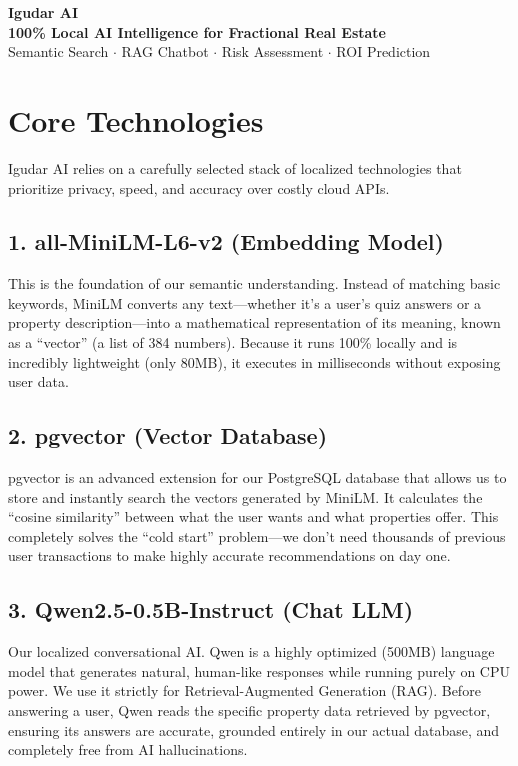 \documentclass[12pt,a4paper]{article}
\begin{document}
\begin{center}
    {\Huge \textbf{\textcolor{primary}{Igudar AI}}}\\[0.5em]
    {\Large \textbf{100\% Local AI Intelligence for Fractional Real Estate}}\\[1em]
    {\small Semantic Search $\cdot$ RAG Chatbot $\cdot$ Risk Assessment $\cdot$ ROI Prediction}
    \vspace{2em}
\end{center}

\section*{Core Technologies}
Igudar AI relies on a carefully selected stack of localized technologies that prioritize privacy, speed, and accuracy over costly cloud APIs.

\subsection*{1. all-MiniLM-L6-v2 (Embedding Model)}
This is the foundation of our semantic understanding. Instead of matching basic keywords, MiniLM converts any text---whether it's a user's quiz answers or a property description---into a mathematical representation of its meaning, known as a ``vector'' (a list of 384 numbers). Because it runs 100\% locally and is incredibly lightweight (only 80MB), it executes in milliseconds without exposing user data.

\subsection*{2. pgvector (Vector Database)}
pgvector is an advanced extension for our PostgreSQL database that allows us to store and instantly search the vectors generated by MiniLM. It calculates the ``cosine similarity'' between what the user wants and what properties offer. This completely solves the ``cold start'' problem---we don't need thousands of previous user transactions to make highly accurate recommendations on day one.

\subsection*{3. Qwen2.5-0.5B-Instruct (Chat LLM)}
Our localized conversational AI. Qwen is a highly optimized (500MB) language model that generates natural, human-like responses while running purely on CPU power. We use it strictly for Retrieval-Augmented Generation (RAG). Before answering a user, Qwen reads the specific property data retrieved by pgvector, ensuring its answers are accurate, grounded entirely in our actual database, and completely free from AI hallucinations.
\end{document}
